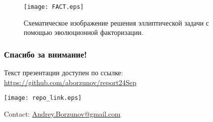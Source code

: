 \documentclass{beamer}
\begin{document}
\begin{frame}
    \begin{figure}
        \texttt{[image: FACT.eps]}
        \caption{Схематическое изображение решения эллиптической задачи с помощью эволюционной факторизации.}
    \end{figure}
\end{frame}


\begin{frame}[allowframebreaks]
    
\end{frame}

\begin{frame}
    \frametitle{Спасибо за внимание!}
    Текст презентации доступен по ссылке:
    \url{https://github.com/aborzunov/report24Sep}
    \begin{figure*}
        \texttt{[image: repo\_link.eps]}
    \end{figure*}
     Contact: \url{Andrey.Borzunov@gmail.com}

\end{frame}
\end{document}
